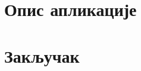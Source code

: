 \documentclass[12pt,oneside]{memoir}
\begin{document}
\chapter{Опис апликације}

\chapter{Закључак}

\literatura
\end{document}
